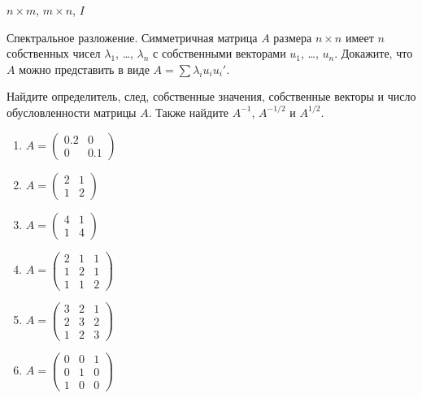 \documentclass[pdftex,11pt,openany]{book}\usepackage[]{graphicx}\usepackage[]{color}
\begin{document}
\begin{solution}
$n\times m$, $m\times n$, $I$ 
\end{solution}



\begin{problem}
Спектральное разложение. Симметричная матрица $A$ размера $n\times n$ имеет $n$ собственных чисел $\lambda_1$, \ldots, $\lambda_n$ с собственными векторами $u_1$, \ldots, $u_n$. Докажите, что $A$ можно представить в виде $A=\sum \lambda_i u_i u_i'$.
\end{problem}

\begin{solution}
\end{solution}


\begin{problem}
Найдите определитель, след, собственные значения, собственные векторы и число
обусловленности матрицы $A$. Также найдите $A^{-1}$, $A^{-1/2}$ и $A^{1/2}$.
\begin{enumerate}
\item $A=\begin{pmatrix}
0.2 & 0 \\
0 & 0.1
\end{pmatrix}$ 
\item $A=\begin{pmatrix}
2 & 1 \\
1 & 2
\end{pmatrix}$ 

\item $A=\begin{pmatrix}
4 & 1 \\
1 & 4
\end{pmatrix}$ 

\item $A=\begin{pmatrix}
2 & 1 & 1 \\
1 & 2 & 1 \\
1 & 1 & 2
\end{pmatrix}$ 

\item $A=\begin{pmatrix}
3 & 2 & 1 \\
2 & 3 & 2 \\
1 & 2 & 3
\end{pmatrix}$ 

\item $A=\begin{pmatrix}
0 & 0 & 1 \\
0 & 1 & 0 \\
1 & 0 & 0
\end{pmatrix}$ 


\end{enumerate}
\end{problem}
\end{document}

